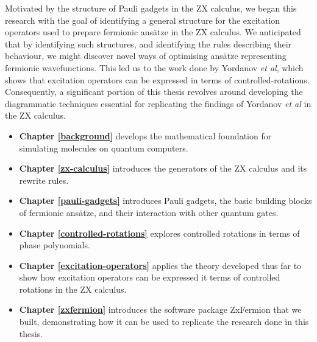 Motivated by the structure of Pauli gadgets in the ZX calculus, we began this research with the goal of identifying a general structure for the excitation operators used to prepare fermionic ansätze in the ZX calculus. We anticipated that by identifying such structures, and identifying the rules describing their behaviour, we might discover novel ways of optimising ansätze representing fermionic wavefunctions. This led us to the work done by Yordanov \textit{et al}, which shows that excitation operators can be expressed in terms of controlled-rotations. Consequently, a significant portion of this thesis revolves around developing the diagrammatic techniques essential for replicating the findings of Yordanov \textit{et al} in the ZX calculus.

\begin{itemize}
    \item \textbf{Chapter \ref{background}} develops the mathematical foundation for simulating molecules on quantum computers.
    \item \textbf{Chapter \ref{zx-calculus}} introduces the generators of the ZX calculus and its rewrite rules.
    \item \textbf{Chapter \ref{pauli-gadgets}} introduces Pauli gadgets, the basic building blocks of fermionic ansätze, and their interaction with other quantum gates.
    \item \textbf{Chapter \ref{controlled-rotations}} explores controlled rotations in terms of phase polynomials.
    \item \textbf{Chapter \ref{excitation-operators}} applies the theory developed thus far to show how excitation operators can be expressed it terms of controlled rotations in the ZX calculus.
    \item \textbf{Chapter \ref{zxfermion}} introduces the software package ZxFermion that we built, demonstrating how it can be used to replicate the research done in this thesis.
\end{itemize}
